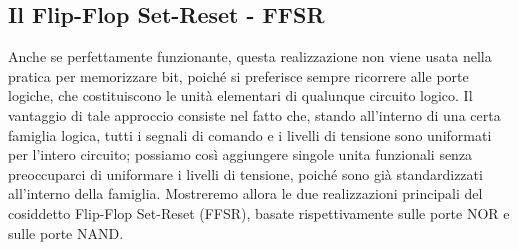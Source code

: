 \documentclass[a4paper]{extarticle}
\begin{document}
\vspace{1em}
\subsection{Il Flip-Flop Set-Reset - FFSR}
Anche se perfettamente funzionante, questa realizzazione non viene usata nella pratica per memorizzare bit, poiché si preferisce sempre ricorrere alle porte logiche, che costituiscono le unità elementari di qualunque circuito logico. Il vantaggio di tale approccio consiste nel fatto che, stando all’interno di una certa famiglia logica, tutti i segnali di comando e i livelli di tensione sono uniformati per l’intero circuito; possiamo così aggiungere singole unita funzionali senza preoccuparci di uniformare i livelli di tensione, poiché sono già standardizzati all’interno della famiglia. Mostreremo allora le due realizzazioni principali del cosiddetto Flip-Flop Set-Reset (FFSR), basate rispettivamente sulle porte NOR e sulle porte NAND.

\vspace{1em}
\noindent
\end{document}
